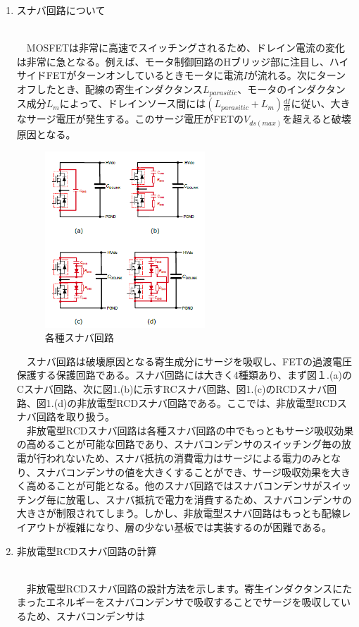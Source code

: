 \documentclass[12pt,a4paper,dvipdfmx]{jarticle}
\begin{document}
\begin{enumerate}
	\item \hypertarget{section1}{スナバ回路について}\\
		　MOSFETは非常に高速でスイッチングされるため、ドレイン電流の変化は非常に急となる。例えば、モータ制御回路のHブリッジ部に注目し、ハイサイドFETがターンオンしているときモータに電流$I$が流れる。次にターンオフしたとき、配線の寄生インダクタンス$L_{parasitic}$、モータのインダクタンス成分$L_{m}$によって、ドレインソース間には$(L_{parasitic}+L_{m})\frac{dI}{dt}$に従い、大きなサージ電圧が発生する。このサージ電圧がFETの$V_{ds(max)}$を超えると破壊原因となる。\\
		\begin{figure}[H]
		\centering
		\includegraphics[width=6cm]{snb.jpg}
		\caption{各種スナバ回路}
		\end{figure}
		　スナバ回路は破壊原因となる寄生成分にサージを吸収し、FETの過渡電圧保護する保護回路である。スナバ回路には大きく4種類あり、まず図１.(a)のCスナバ回路、次に図1.(b)に示すRCスナバ回路、図1.(c)のRCDスナバ回路、図1.(d)の非放電型RCDスナバ回路である。ここでは、非放電型RCDスナバ回路を取り扱う。\\
		　非放電型RCDスナバ回路は各種スナバ回路の中でもっともサージ吸収効果の高めることが可能な回路であり、スナバコンデンサのスイッチング毎の放電が行われないため、スナバ抵抗の消費電力はサージによる電力のみとなり、スナバコンデンサの値を大きくすることができ、サージ吸収効果を大きく高めることが可能となる。他のスナバ回路ではスナバコンデンサがスイッチング毎に放電し、スナバ抵抗で電力を消費するため、スナバコンデンサの大きさが制限されてしまう。しかし、非放電型スナバ回路はもっとも配線レイアウトが複雑になり、層の少ない基板では実装するのが困難である。
	\item \hypertarget{section2}{非放電型RCDスナバ回路の計算}\\
		 　非放電型RCDスナバ回路の設計方法を示します。寄生インダクタンスにたまったエネルギーをスナバコンデンサで吸収することでサージを吸収しているため、スナバコンデンサは

\end{enumerate}
\end{document}

